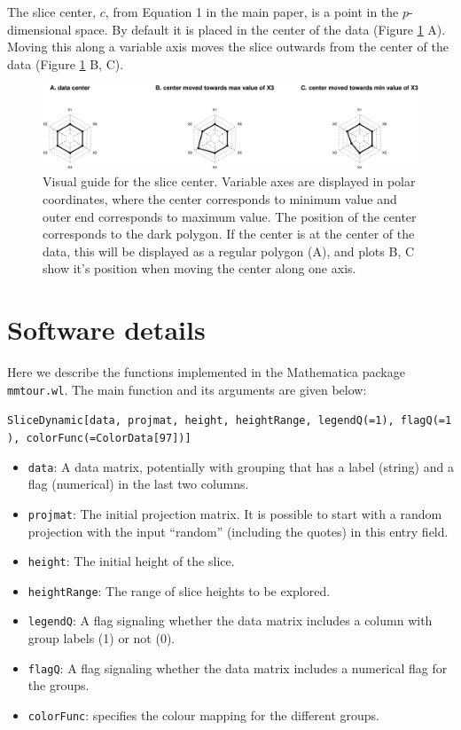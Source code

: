 \documentclass[]{interact}
\theoremstyle{plain}%
\theoremstyle{definition}
\theoremstyle{remark}
\providecommand{\tightlist}{%
  \setlength{\itemsep}{0pt}\setlength{\parskip}{0pt}}
\def\tightlist{}
\begin{document}
The slice center, \(c\), from Equation 1 in the main paper, is a point
in the \(p\)-dimensional space. By default it is placed in the center of
the data (Figure \ref{fig:anchornav} A). Moving this along a variable
axis moves the slice outwards from the center of the data (Figure
\ref{fig:anchornav} B, C).

\begin{figure}
\includegraphics[width=1\linewidth]{appendix_files/figure-latex/anchornav-1} \caption{Visual guide for the slice center. Variable axes are displayed in polar coordinates, where the center corresponds to minimum value and outer end corresponds to maximum value. The position of the center corresponds to the dark polygon. If the center is at the center of the data, this will be displayed as a regular polygon (A), and plots B, C show it's position when moving the center along one axis.}\label{fig:anchornav}
\end{figure}

\hypertarget{software-details}{%
\section{Software details}\label{software-details}}

Here we describe the functions implemented in the Mathematica package
\texttt{mmtour.wl}. The main function and its arguments are given below:

\texttt{SliceDynamic{[}data,\ projmat,\ height,\ heightRange,\ legendQ(=1),\ flagQ(=1),\ colorFunc(=ColorData{[}97{]}){]}}

\begin{itemize}
\tightlist
\item
  \texttt{data}: A data matrix, potentially with grouping that has a
  label (string) and a flag (numerical) in the last two columns.
\item
  \texttt{projmat}: The initial projection matrix. It is possible to
  start with a random projection with the input ``random'' (including
  the quotes) in this entry field.
\item
  \texttt{height}: The initial height of the slice.
\item
  \texttt{heightRange}: The range of slice heights to be explored.
\item
  \texttt{legendQ}: A flag signaling whether the data matrix includes a
  column with group labels (1) or not (0).
\item
  \texttt{flagQ}: A flag signaling whether the data matrix includes a
  numerical flag for the groups.
\item
  \texttt{colorFunc}: specifies the colour mapping for the different
  groups.
\end{itemize}
\end{document}
